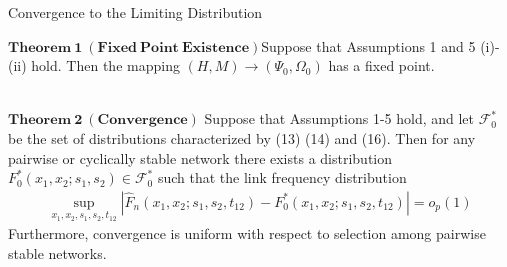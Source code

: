 \documentclass{beamer}		%
\begin{document}
\begin{frame}{Convergence to the Limiting Distribution}

$\bm{Theorem\  1\ (Fixed\ Point\ Existence)}$Suppose that Assumptions 1 and 5 (i)-(ii) hold. Then the mapping $(H,M) \to (\Psi_0,\Omega_0)$ has a fixed point.

~\\
$\bm{Theorem\ 2\ (Convergence)}$ Suppose that Assumptions 1-5 hold, and let $\mathcal{F}_0^*$ be the set of distributions characterized by (13) (14) and (16). Then for any pairwise or cyclically stable network there exists a distribution $F_0^*(x_1, x_2; s_1, s_2) \in \mathcal{F}_0^*$ such that the link frequency distribution
\begin{align*}
    \sup_{x_1,x_2,s_1,s_2,t_{12}} |\hat{F}_n(x_1,x_2;s_1,s_2,t_{12}) - F_0^*(x_1,x_2;s_1,s_2,t_{12})| = o_p(1)
\end{align*}
Furthermore, convergence is uniform with respect to selection among pairwise stable networks.

\end{frame}
\end{document}

